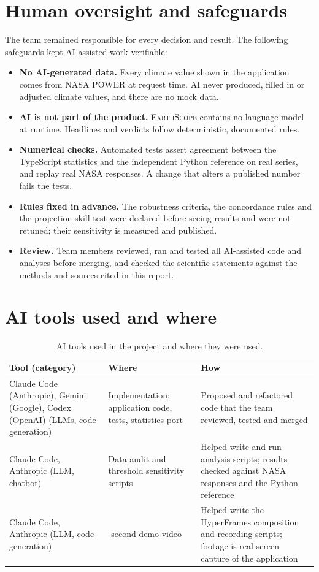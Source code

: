 \documentclass[12pt, oneside, openany]{report}
\newcommand{\EarthScope}{\textsc{EarthScope}}
\begin{document}
\section{Human oversight and safeguards}

The team remained responsible for every decision and result. The following safeguards kept AI-assisted work verifiable:

\begin{itemize}[leftmargin=*]
    \item \textbf{No AI-generated data.} Every climate value shown in the application comes from NASA POWER at request time. AI never produced, filled in or adjusted climate values, and there are no mock data.
    \item \textbf{AI is not part of the product.} \EarthScope{} contains no language model at runtime. Headlines and verdicts follow deterministic, documented rules.
    \item \textbf{Numerical checks.} Automated tests assert agreement between the TypeScript statistics and the independent Python reference on real series, and replay real NASA responses. A change that alters a published number fails the tests.
    \item \textbf{Rules fixed in advance.} The robustness criteria, the concordance rules and the projection skill test were declared before seeing results and were not retuned; their sensitivity is measured and published.
    \item \textbf{Review.} Team members reviewed, ran and tested all AI-assisted code and analyses before merging, and checked the scientific statements against the methods and sources cited in this report.
\end{itemize}

\section{AI tools used and where}

\begin{table}[H]
\centering
\caption{AI tools used in the project and where they were used.}
\label{tab:ai}
\small
\begin{tabularx}{\linewidth}{@{}>{\raggedright\arraybackslash}p{3.4cm}>{\raggedright\arraybackslash}p{3.6cm}X@{}}
\toprule
\textbf{Tool (category)} & \textbf{Where} & \textbf{How} \\
\midrule
Claude Code (Anthropic), Gemini (Google), Codex (OpenAI) (LLMs, code generation) & Implementation: application code, tests, statistics port & Proposed and refactored code that the team reviewed, tested and merged \\
Claude Code, Anthropic (LLM, chatbot) & Data audit and threshold sensitivity scripts & Helped write and run analysis scripts; results checked against NASA responses and the Python reference \\
Claude Code, Anthropic (LLM, code generation) & 30-second demo video & Helped write the HyperFrames composition and recording scripts; footage is real screen capture of the application \\
\bottomrule
\end{tabularx}
\end{table}
\end{document}
